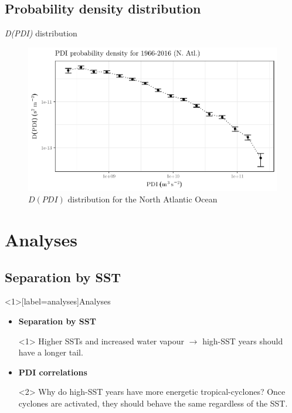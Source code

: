 \subsection{Probability density distribution}
\begin{frame}{\emph{D(PDI)} distribution}
\begin{figure}[H]
	\centering
	\includegraphics[scale=0.6]{images/dpdi-natl}
	\caption{$D(PDI)$ distribution for the North Atlantic Ocean}
	\label{fig:figure1}
\end{figure}
\end{frame}

\section{Analyses}
\subsection{Separation by SST}

\begin{frame}<1>[label=analyses]{Analyses}
\begin{itemize}[<+>]
	\item \textbf{Separation by SST}

	\begin{onlyenv}
		Higher SSTs and increased water vapour $\to$ high-SST years should have a longer tail.
	\end{onlyenv}
	\item \textbf{PDI correlations}

	\begin{onlyenv}
		Why do high-SST years have more energetic tropical-cyclones?
		Once cyclones are activated, they should behave the same regardless of the SST.
	\end{onlyenv}
\end{itemize}
\end{frame}



